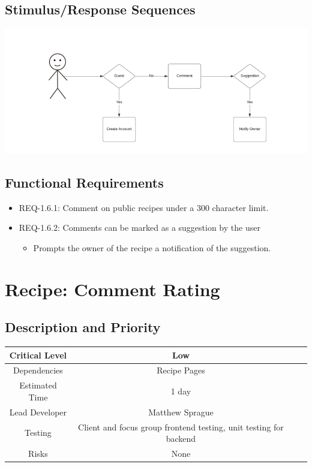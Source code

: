 \documentclass{scrreprt}
\begin{document}
\subsection{Stimulus/Response Sequences}

\includegraphics{FlowCharts/Recipe-Commenting.png}

\subsection{Functional Requirements}

\begin{itemize}
    \item REQ-1.6.1: Comment on public recipes under a 300 character limit.
    \item REQ-1.6.2: Comments can be marked as a suggestion by the user
        \begin{itemize}
            \item Prompts the owner of the recipe a notification of the suggestion.
        \end{itemize}
\end{itemize}

\section{Recipe: Comment Rating}

\subsection{Description and Priority}
\begin{center}
    \begin{tabular}{| c | c | c | c |}
        \hline
        Critical Level & Low \\
        \hline
        Dependencies & Recipe Pages \\
        \hline
        Estimated Time & 1 day \\
        \hline
        Lead Developer & Matthew Sprague \\
        \hline
        Testing & Client and focus group frontend testing, unit testing for backend \\
        \hline
        Risks & None \\
        \hline
    \end{tabular}
\end{center}
\end{document}

